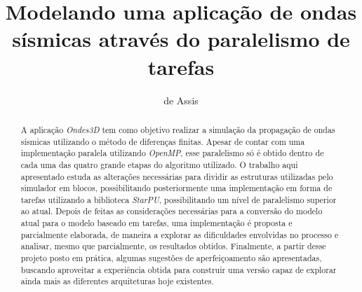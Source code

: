 \documentclass[cic,tc]{iiufrgs}
\title{Modelando uma aplicação de ondas sísmicas através do paralelismo de tarefas}
\author{de Assis}{Lucas Barros}
\begin{document}
\maketitle





\begin{abstract}
  A aplicação \textit{Ondes3D} tem como objetivo realizar a simulação da propagação de ondas sísmicas utilizando o método de diferenças finitas.
  Apesar de contar com uma implementação paralela utilizando \textit{OpenMP}, esse paralelismo só é obtido dentro de cada uma das quatro grande etapas do algoritmo utilizado.
  O trabalho aqui apresentado estuda as alterações necessárias para dividir as estruturas utilizadas pelo simulador em blocos, possibilitando
  posteriormente uma implementação em forma de tarefas utilizando a biblioteca \textit{StarPU}, possibilitando um nível de paralelismo superior ao atual.
  Depois de feitas as considerações necessárias para a conversão do modelo atual para o modelo baseado em tarefas, uma implementação é proposta e parcialmente
  elaborada, de maneira a explorar as dificuldades envolvidas no processo e analisar, mesmo que parcialmente, os resultados obtidos.
  Finalmente, a partir desse projeto posto em prática, algumas sugestões de aperfeiçoamento são apresentadas, buscando aproveitar a experiência obtida para
  construir uma versão capaz de explorar ainda mais as diferentes arquiteturas hoje existentes.
\end{abstract}
\end{document}
